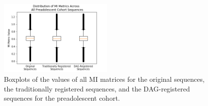 \clearpage

\begin{figure}
\centering
\includegraphics[width=0.5\textwidth]{6/figures/preads-mi-box.png}
\caption{Boxplots of the values of all MI matrices for the original sequences, the traditionally registered sequences, and the DAG-registered sequences for the preadolescent cohort.}
\label{fig:preads-mi-box}
\end{figure}

